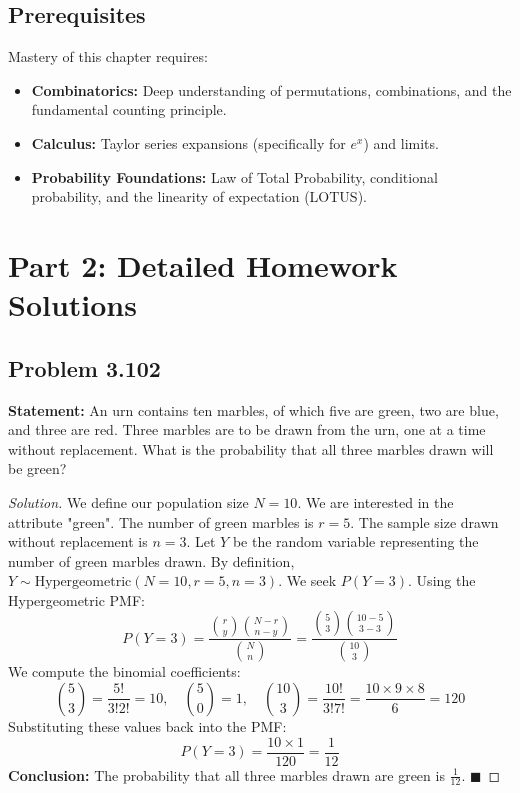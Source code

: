 \documentclass[11pt]{article}
\theoremstyle{definition}
\theoremstyle{remark}
\begin{document}
\subsection{Prerequisites}
Mastery of this chapter requires:
\begin{itemize}
    \item \textbf{Combinatorics:} Deep understanding of permutations, combinations, and the fundamental counting principle.
    \item \textbf{Calculus:} Taylor series expansions (specifically for $e^x$) and limits.
    \item \textbf{Probability Foundations:} Law of Total Probability, conditional probability, and the linearity of expectation (LOTUS).
\end{itemize}

\newpage
\section{Part 2: Detailed Homework Solutions}

\subsection*{Problem 3.102}
\textbf{Statement:} An urn contains ten marbles, of which five are green, two are blue, and three are red. Three marbles are to be drawn from the urn, one at a time without replacement. What is the probability that all three marbles drawn will be green?

\begin{proof}[Solution]
We define our population size $N = 10$. We are interested in the attribute "green". The number of green marbles is $r = 5$. The sample size drawn without replacement is $n = 3$. Let $Y$ be the random variable representing the number of green marbles drawn. 
By definition, $Y \sim \text{Hypergeometric}(N=10, r=5, n=3)$.
We seek $P(Y = 3)$. Using the Hypergeometric PMF:
\[ P(Y = 3) = \frac{\binom{r}{y}\binom{N-r}{n-y}}{\binom{N}{n}} = \frac{\binom{5}{3}\binom{10-5}{3-3}}{\binom{10}{3}} \]
We compute the binomial coefficients:
\[ \binom{5}{3} = \frac{5!}{3!2!} = 10, \quad \binom{5}{0} = 1, \quad \binom{10}{3} = \frac{10!}{3!7!} = \frac{10 \times 9 \times 8}{6} = 120 \]
Substituting these values back into the PMF:
\[ P(Y = 3) = \frac{10 \times 1}{120} = \frac{1}{12} \]
\textbf{Conclusion:} The probability that all three marbles drawn are green is $\frac{1}{12}$. $\blacksquare$
\end{proof}
\end{document}
